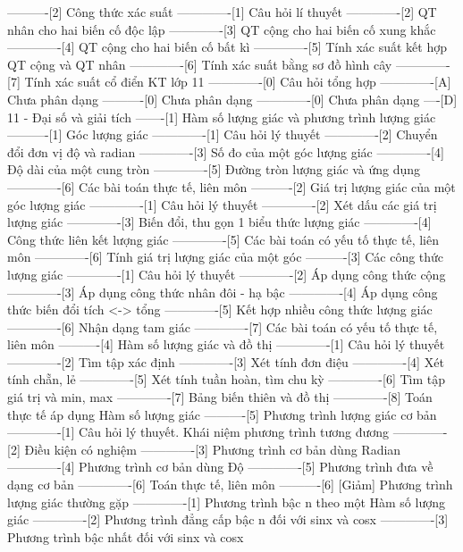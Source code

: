 ----------[2] Công thức xác suất
-------------[1] Câu hỏi lí thuyết
-------------[2] QT nhân cho hai biến cố độc lập
-------------[3] QT cộng cho hai biến cố xung khắc
-------------[4] QT cộng cho hai biến cố bất kì
-------------[5] Tính xác suất kết hợp QT cộng và QT nhân
-------------[6] Tính xác suất bằng sơ đồ hình cây
-------------[7] Tính xác suất cổ điển KT lớp 11
-------------[0] Câu hỏi tổng hợp
-------------[A] Chưa phân dạng
----------[0] Chưa phân dạng
-------------[0] Chưa phân dạng
----[D] 11 - Đại số và giải tích
-------[1] Hàm số lượng giác và phương trình lượng giác
----------[1] Góc lượng giác
-------------[1] Câu hỏi lý thuyết
-------------[2] Chuyển đổi đơn vị độ và radian
-------------[3] Số đo của một góc lượng giác
-------------[4] Độ dài của một cung tròn
-------------[5] Đường tròn lượng giác và ứng dụng
-------------[6] Các bài toán thực tế, liên môn
----------[2] Giá trị lượng giác của một góc lượng giác
-------------[1] Câu hỏi lý thuyết
-------------[2] Xét dấu các giá trị lượng giác
-------------[3] Biến đổi, thu gọn 1 biểu thức lượng giác
-------------[4] Công thức liên kết lượng giác
-------------[5] Các bài toán có yếu tố thực tế, liên môn
-------------[6] Tính giá trị lượng giác của một góc
----------[3] Các công thức lượng giác
-------------[1] Câu hỏi lý thuyết
-------------[2] Áp dụng công thức cộng
-------------[3] Áp dụng công thức nhân đôi - hạ bậc
-------------[4] Áp dụng công thức biến đổi tích <-> tổng
-------------[5] Kết hợp nhiều công thức lượng giác
-------------[6] Nhận dạng tam giác
-------------[7] Các bài toán có yếu tố thực tế, liên môn
----------[4] Hàm số lượng giác và đồ thị
-------------[1] Câu hỏi lý thuyết
-------------[2] Tìm tập xác định
-------------[3] Xét tính đơn điệu
-------------[4] Xét tính chẵn, lẻ
-------------[5] Xét tính tuần hoàn, tìm chu kỳ
-------------[6] Tìm tập giá trị và min, max
-------------[7] Bảng biến thiên và đồ thị
-------------[8] Toán thực tế áp dụng Hàm số lượng giác
----------[5] Phương trình lượng giác cơ bản
-------------[1] Câu hỏi lý thuyết. Khái niệm phương trình tương đương
-------------[2] Điều kiện có nghiệm
-------------[3] Phương trình cơ bản dùng Radian
-------------[4] Phương trình cơ bản dùng Độ
-------------[5] Phương trình đưa về dạng cơ bản
-------------[6] Toán thực tế, liên môn
----------[6] [Giảm] Phương trình lượng giác thường gặp
-------------[1] Phương trình bậc n theo một Hàm số lượng giác
-------------[2] Phương trình đẳng cấp bậc n đối với sinx và cosx
-------------[3] Phương trình bậc nhất đối với sinx và cosx
